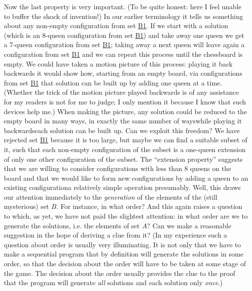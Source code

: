 \documentclass[twoside,11pt]{book}
\begin{document}
Now the last property is very important. (To be quite honest: here I feel unable to buffer the shock of invention!) In our earlier terminology it tells us something about any non-empty configuration from set \hyperref[en:b1-eight-queens]{B1}. If we start with a solution (which is an 8-queen configuration from set \hyperref[en:b1-eight-queens]{B1}) and take away one queen we get a 7-queen configuration from set \hyperref[en:b1-eight-queens]{B1}; taking away a next queen will leave again a configuration from set \hyperref[en:b1-eight-queens]{B1} and we can repeat this process until the chessboard is empty. We could have taken a motion picture of this process: playing it back backwards it would show how, starting from an empty board, via configurations from set \hyperref[en:b1-eight-queens]{B1} that solution can be built up by adding one queen at a time. (Whether the trick of the motion picture played backwards is of any assistance for my readers is not for me to judge; I only mention it because I know that such devices help me.) When making the picture, any solution could be reduced to the empty board in many ways, in exactly the same number of ways\textemdash{}while playing it backwards\textemdash{}each solution can be built up. Can we exploit this freedom? We have rejected set \hyperref[en:b1-eight-queens]{B1} because it is too large, but maybe we can find a suitable subset of it, such that each non-empty configuration of the subset is a one-queen extension of only one other configuration of the subset. The ``extension property'' suggests that we are willing to consider configurations with less than 8 queens on the board and that we would like to form new configurations by adding a queen to an existing configuration\textemdash{}a relatively simple operation presumably. Well, this draws our attention immediately to the \textit{generation} of the elements of the (still mysterious) set $B$. For instance, in what order? And this again raises a question to which, as yet, we have not paid the slightest attention: in what order are we to generate the solutions, i.e. the elements of set $A$? Can we make a reasonable suggestion in the hope of deriving a clue from it? (In my experience such a question about order is usually very illuminating. It is not only that we have to make a sequential program that by definition will generate the solutions in some order, so that the decision about the order will have to be taken at some stage of the game. The decision about the order usually provides the clue to the proof that the program will generate \textit{all} solutions and each solution only \textit{once}.)
\end{document}
